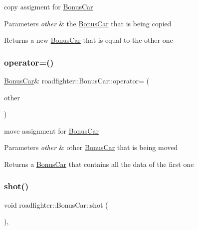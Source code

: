 copy assigment for \hyperlink{classroadfighter_1_1BonusCar}{Bonus\+Car} 
\begin{DoxyParams}{Parameters}
{\em other} & the \hyperlink{classroadfighter_1_1BonusCar}{Bonus\+Car} that is being copied \\
\hline
\end{DoxyParams}
\begin{DoxyReturn}{Returns}
a new \hyperlink{classroadfighter_1_1BonusCar}{Bonus\+Car} that is equal to the other one 
\end{DoxyReturn}
\mbox{\label{classroadfighter_1_1BonusCar_a9fd4f5d8559cd48aa408ff032b92c9f4}} 
\subsubsection{\texorpdfstring{operator=()}{operator=()}\hspace{0.1cm}{\footnotesize\ttfamily [2/2]}}
{\footnotesize\ttfamily \hyperlink{classroadfighter_1_1BonusCar}{Bonus\+Car}\& roadfighter\+::\+Bonus\+Car\+::operator= (\begin{DoxyParamCaption}\item[{\hyperlink{classroadfighter_1_1BonusCar}{Bonus\+Car} \&\&}]{other }\end{DoxyParamCaption})\hspace{0.3cm}{\ttfamily [default]}}

move assignment for \hyperlink{classroadfighter_1_1BonusCar}{Bonus\+Car} 
\begin{DoxyParams}{Parameters}
{\em other} & other \hyperlink{classroadfighter_1_1BonusCar}{Bonus\+Car} that is being moved \\
\hline
\end{DoxyParams}
\begin{DoxyReturn}{Returns}
a \hyperlink{classroadfighter_1_1BonusCar}{Bonus\+Car} that contains all the data of the first one 
\end{DoxyReturn}
\mbox{\label{classroadfighter_1_1BonusCar_a02edcd22a86c1f98642c3703ef8dfb16}} 
\subsubsection{\texorpdfstring{shot()}{shot()}}
{\footnotesize\ttfamily void roadfighter\+::\+Bonus\+Car\+::shot (\begin{DoxyParamCaption}{ }\end{DoxyParamCaption})\hspace{0.3cm}{\ttfamily [override]}, {\ttfamily [virtual]}}

